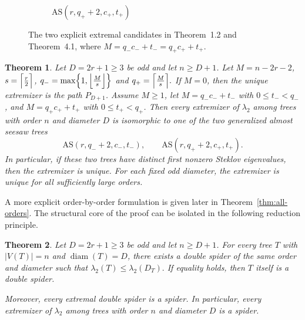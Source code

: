 \documentclass[11pt]{article}
\newtheorem{theorem}{Theorem}[section]
\theoremstyle{remark}
\newcommand{\diam}{\operatorname{diam}}
\newcommand{\AS}{\mathrm{AS}}
\begin{document}
\begin{figure}[htbp]
\begin{subfigure}[b]{0.47\textwidth}
\caption{$\mathrm{AS}(r,q_{+}+2,c_{+},t_{+})$}
\end{subfigure}

\caption{The two explicit extremal candidates in Theorem~1.2 and Theorem~4.1, where
$M=q_{-}c_{-}+t_{-}=q_{+}c_{+}+t_{+}$.}
\end{figure}
\begin{theorem}\label{thm:odd-main}
	Let $D=2r+1\ge 3$ be odd and let $n\ge D+1$. Let $
M=n-2r-2$, $s=\Bigl\lceil \frac r2\Bigr\rceil$, $q_- = \max\Bigl\{1,\Bigl\lfloor \frac Ms\Bigr\rfloor\Bigr\}$ and $q_+ = \Bigl\lceil \frac Ms\Bigr\rceil.$
If $M=0$, then the unique extremizer is the path $P_{D+1}$. Assume $M\ge 1$, let $M=q_-c_-+t_-$ with $ 0\le t_-<q_-$, and $M=q_+c_++t_+$ with $0\le t_+<q_+$.
Then every extremizer of $\lambda_2$ among trees with order $n$ and diameter $D$ is
isomorphic to one of the two generalized almost seesaw trees
$$
\AS(r,q_-+2,c_-,t_-),
\qquad
\AS(r,q_++2,c_+,t_+).
$$
In particular, if these two trees have distinct first nonzero Steklov eigenvalues, then the extremizer is unique.
For each fixed odd diameter, the extremizer is unique for all sufficiently large orders.
\end{theorem}
A more explicit order-by-order formulation is given later in Theorem~\ref{thm:all-orders}. The
structural core of the proof can be isolated in the following reduction principle.

\begin{theorem}\label{thm:reduction-principle}
Let $D=2r+1\ge 3$ be odd and let $n\ge D+1$. For every tree $T$ with $|V(T)|=n$ and
$\diam(T)=D$, there exists a double spider of the same order and diameter such that $\lambda_2(T)\le \lambda_2(D_T).$ If equality holds, then $T$ itself is a double spider. 

Moreover, every extremal double spider is a spider.
In particular, every extremizer of $\lambda_2$ among trees with order $n$ and diameter $D$
is a spider.
\end{theorem}
\end{document}
